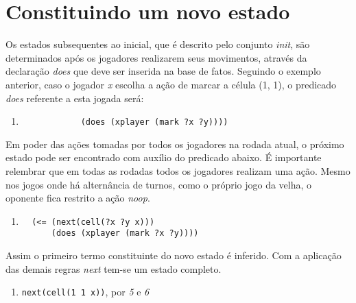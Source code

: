  
 \section{Constituindo um novo estado}
 Os estados subsequentes ao inicial, que é descrito pelo conjunto \textit{init}, são determinados após os jogadores realizarem seus movimentos, através da declaração \textit{does} que deve ser inserida na base de fatos. Seguindo o exemplo anterior, caso o jogador \textit{x} escolha a ação de marcar a célula (1, 1), o predicado \textit{does} referente a esta jogada será:
\begin{enumerate}
  	\singlespacing
  	\setcounter{enumi}{4}
	\item 
		\begin{verbatim}
			(does (xplayer (mark ?x ?y))))
		\end{verbatim}		
\end{enumerate}
 \doublespacing

Em poder das ações tomadas por todos os jogadores na rodada atual, o próximo estado pode ser encontrado com auxílio do predicado abaixo. É importante relembrar que em todas as rodadas todos os jogadores realizam uma ação. Mesmo nos jogos onde há alternância de turnos, como o próprio jogo da velha, o oponente fica restrito a ação \textit{noop}.
\begin{enumerate}
  	\singlespacing
  	\setcounter{enumi}{5}
   	\item 
   		\begin{verbatim}
  (<= (next(cell(?x ?y x)))
      (does (xplayer (mark ?x ?y))))               
 		\end{verbatim}
\end{enumerate}
\doublespacing
Assim o primeiro termo constituinte do novo estado é inferido. Com a aplicação das demais regras \textit{next} tem-se um estado completo. 
\begin{enumerate}
  	\singlespacing
  	\setcounter{enumi}{6}
	\item 
		\verb|next(cell(1 1 x))|, por {\it 5} e {\it 6}
\end{enumerate}
\doublespacing